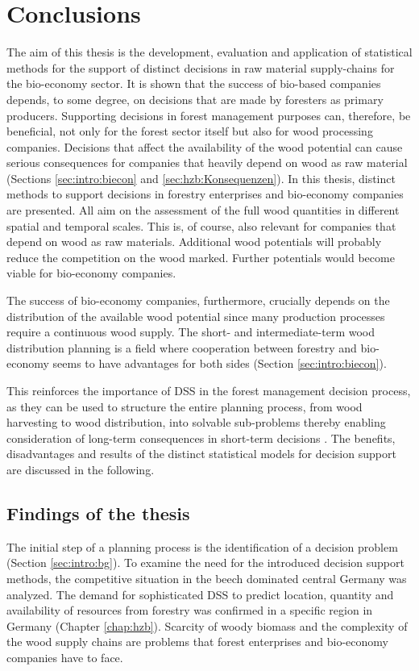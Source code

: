 \chapter{Conclusions}
\label{chap:discussion}
\newpage
\noindent
The aim of this thesis is the development, evaluation and application of statistical methods for the support of distinct decisions in raw material supply-chains for the bio-economy sector. It is shown that the success of bio-based companies depends, to some degree, on decisions that are made by foresters as primary producers. Supporting decisions in forest management purposes can, therefore, be beneficial, not only for the forest sector itself but also for wood processing companies. Decisions that affect the availability of the wood potential can cause serious consequences for companies that heavily depend on wood as raw material (Sections \ref{sec:intro:biecon} and \ref{sec:hzb:Konsequenzen}). In this thesis, distinct methods to support decisions in forestry enterprises and bio-economy companies are presented. All aim on the assessment of the full wood quantities in different spatial and temporal scales. This is, of course, also relevant for companies that depend on wood as raw materials. Additional wood potentials will probably reduce the competition on the wood marked. Further potentials would become viable for bio-economy companies.

The success of bio-economy companies, furthermore, crucially depends on the distribution of the available wood potential since many production processes require a continuous wood supply. The short- and intermediate-term wood distribution planning is a field where cooperation between forestry and bio-economy seems to have advantages for both sides (Section \ref{sec:intro:biecon}).

This reinforces the importance of DSS in the forest management decision process, as they can be used to structure the entire planning process, from wood harvesting to wood distribution, into solvable sub-problems thereby enabling consideration of long-term consequences in short-term decisions \citep[p. 1065-1067, 1081]{pretzsch_2008}. The benefits, disadvantages and results of the distinct statistical models for decision support are discussed in the following.

\section{Findings of the thesis}
\label{sec:discussion:findings}
The initial step of a planning process is the identification of a decision problem (Section \ref{sec:intro:bg}). To examine the need for the introduced decision support methods, the competitive situation in the beech dominated central Germany was analyzed. The demand for sophisticated DSS to predict location, quantity and availability of resources from forestry was confirmed in a specific region in Germany (Chapter \ref{chap:hzb}). Scarcity of woody biomass and the complexity of the wood supply chains are problems that forest enterprises and bio-economy companies have to face.

